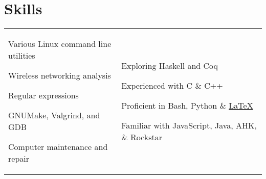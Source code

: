 \documentclass[10.5pt, letterpaper]{article}
\newenvironment{TitleDescription}[1]                    %
{                                                       %
	\begin{description}                                 %
		\item [#1]                                      %
		\let\realitem\item                              %
		\renewcommand{\item}[1]{\let\item\realitem ##1} %
}{                                                      %
	\end{description}                                   %
}
\begin{document}
\section*{Skills}
\begin{flushleft}
	\begin{tabularx}{\textwidth}{X X}
		\begin{description}
			\item Various Linux command line utilities
			\item Wireless networking analysis
			\item Regular expressions
			\item GNUMake, Valgrind, and GDB
			\item Computer maintenance and repair	
		\end{description} &

		\begin{TitleDescription}{Programming Languages}
			\item Exploring Haskell and Coq
			\item Experienced with C \& C++
			\item Proficient in Bash, Python \& \href{https://github.com/baricus/resume}{\LaTeX{}}
			\item Familiar with JavaScript, Java, AHK, \& Rockstar
		\end{TitleDescription} 
	\end{tabularx}
\end{flushleft}
\end{document}
